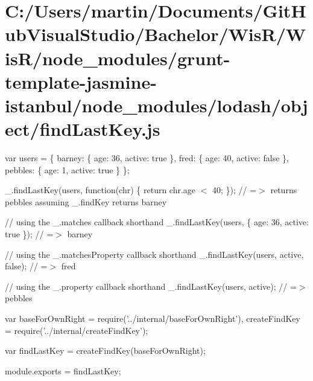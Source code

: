 \hypertarget{_c_1_2_users_2martin_2_documents_2_git_hub_visual_studio_2_bachelor_2_wis_r_2_wis_r_2node_module307245d45ed570a3e1eb46bfb79f843c}{}\section{C\+:/\+Users/martin/\+Documents/\+Git\+Hub\+Visual\+Studio/\+Bachelor/\+Wis\+R/\+Wis\+R/node\+\_\+modules/grunt-\/template-\/jasmine-\/istanbul/node\+\_\+modules/lodash/object/find\+Last\+Key.\+js}
var users = \{ \textquotesingle{}barney\textquotesingle{}\+: \{ \textquotesingle{}age\textquotesingle{}\+: 36, \textquotesingle{}active\textquotesingle{}\+: true \}, \textquotesingle{}fred\textquotesingle{}\+: \{ \textquotesingle{}age\textquotesingle{}\+: 40, \textquotesingle{}active\textquotesingle{}\+: false \}, \textquotesingle{}pebbles\textquotesingle{}\+: \{ \textquotesingle{}age\textquotesingle{}\+: 1, \textquotesingle{}active\textquotesingle{}\+: true \} \};

\+\_\+.\+find\+Last\+Key(users, function(chr) \{ return chr.\+age $<$ 40; \}); // =$>$ returns {\ttfamily pebbles} assuming {\ttfamily \+\_\+.\+find\+Key} returns {\ttfamily barney}

// using the {\ttfamily \+\_\+.\+matches} callback shorthand \+\_\+.\+find\+Last\+Key(users, \{ \textquotesingle{}age\textquotesingle{}\+: 36, \textquotesingle{}active\textquotesingle{}\+: true \}); // =$>$ \textquotesingle{}barney\textquotesingle{}

// using the {\ttfamily \+\_\+.\+matches\+Property} callback shorthand \+\_\+.\+find\+Last\+Key(users, \textquotesingle{}active\textquotesingle{}, false); // =$>$ \textquotesingle{}fred\textquotesingle{}

// using the {\ttfamily \+\_\+.\+property} callback shorthand \+\_\+.\+find\+Last\+Key(users, \textquotesingle{}active\textquotesingle{}); // =$>$ \textquotesingle{}pebbles\textquotesingle{}


\begin{DoxyCodeInclude}
var baseForOwnRight = require(\textcolor{stringliteral}{'../internal/baseForOwnRight'}),
    createFindKey = require(\textcolor{stringliteral}{'../internal/createFindKey'});

var findLastKey = createFindKey(baseForOwnRight);

module.exports = findLastKey;
\end{DoxyCodeInclude}
 